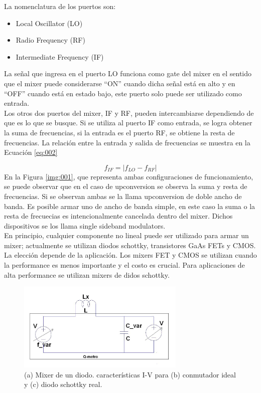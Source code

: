 \documentclass[a4paper,10pt]{article}
\begin{document}
	\indent La nomenclatura de los puertos son:
	\begin{itemize}
		\item Local Oscillator (LO)
		\item Radio Frequency (RF)
		\item Intermediate Frequency (IF)
	\end{itemize}

	\indent La señal que ingresa en el puerto LO funciona como gate del mixer 
	en el sentido que el mixer puede considerarse ``ON'' cuando dicha señal está en
	alto y en ``OFF'' cuando está en estado bajo, este puerto solo puede ser utilizado como entrada. \\
	\indent Los otros dos puertos del mixer, IF y RF, pueden intercambiarse 
	dependiendo de que es lo que se busque. Si se utiliza al puerto IF como entrada, se logra obtener la suma de frecuencias, si la entrada es 
	el puerto RF, se obtiene la resta de frecuencias. La relación entre la entrada y salida de 
	frecuencias se muestra en la Ecuación \ref{eq:002}

	\begin{equation}\label{eq:002}
		f_{IF} = |f_{LO} - f_{RF}|
	\end{equation}
	\indent En la Figura \ref{img:001}, que representa ambas configuraciones de 
	funcionamiento, se puede observar que en el caso de upconversion se observa
	la suma y resta de frecuencias. Si se observan ambas se la llama 
	upconversion de doble ancho de banda. Es posible armar uno de ancho de banda
	simple, en este caso la suma o la resta de frecuecias es intencionalmente 
	cancelada dentro del mixer. Dichos dispositivos se los llama single sideband
	modulators. \\
	\indent En principio, cualquier componente no lineal puede ser utilizado 
	para armar un mixer; actualmente se utilizan diodos schottky, transistores 
	GaAs FETs y CMOS. La elección depende de la aplicación. Los mixers FET y 
	CMOS se utilizan cuando la performance es menos importante y el costo es 
	crucial. Para aplicaciones de alta performance se utilizan mixers de didos 
	schottky.
	
	\begin{figure}[!htb]
		\centering
		\includegraphics[width=8cm]
		{Images/qmetro.png}
		\caption{(a) Mixer de un diodo. características I-V para (b)
		conmutador ideal y (c) diodo schottky real.}
		\label{img:002} 
	\end{figure}
\end{document}
